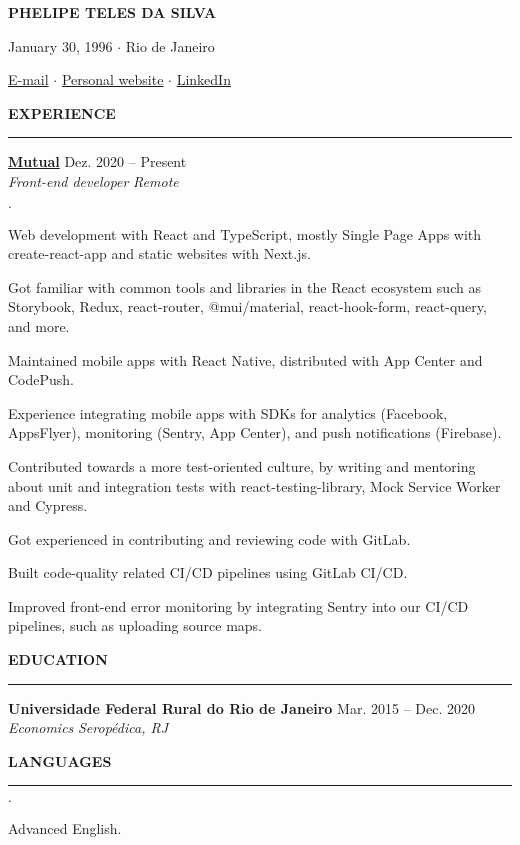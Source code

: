 \documentclass[12pt,letterpaper]{article}
\newenvironment{tightlist}
  {\begin{list}
    {$\cdot$}
    {
      \setlength{\leftmargin}{0em}
      \setlength{\itemsep}{-\smallskipamount}
    }
  }
{\end{list}}
\begin{document}
\pagestyle{empty}

\centerline{\huge\bf PHELIPE TELES DA SILVA}
\medskip

\centerline{January 30, 1996 $\cdot$ Rio de Janeiro}
\smallskip

\centerline{
  \href{mailto:telesphelipe@gmail.com}{E-mail}
  $\cdot$
  \href{https://phelipetls.github.io}{Personal website}
  $\cdot$
  \href{https://linkedin.com/in/phelipeteles}{LinkedIn}
}
\smallskip

\medskip \textbf{EXPERIENCE} \medskip
\hrule

\textbf{\href{https://mutual.club}{Mutual}} \hfill Dez. 2020 -- Present \\
\emph{Front-end developer} \hfill \emph{Remote} {\parfillskip=0pt\par}

\begin{tightlist}
  \item Web development with React and TypeScript, mostly Single Page Apps with
    create-react-app and static websites with Next.js.
  \item Got familiar with common tools and libraries in the React ecosystem such
    as Storybook, Redux, react-router, @mui/material, react-hook-form,
    react-query, and more.
  \item Maintained mobile apps with React Native, distributed with App Center
    and CodePush.
  \item Experience integrating mobile apps with SDKs for analytics (Facebook,
    AppsFlyer), monitoring (Sentry, App Center), and push notifications
    (Firebase).
  \item Contributed towards a more test-oriented culture, by writing and
    mentoring about unit and integration tests with react-testing-library, Mock
    Service Worker and Cypress.
  \item Got experienced in contributing and reviewing code with GitLab.
  \item Built code-quality related CI/CD pipelines using GitLab CI/CD.
  \item Improved front-end error monitoring by integrating Sentry into our CI/CD
    pipelines, such as uploading source maps.
\end{tightlist}

\medskip \textbf{EDUCATION} \medskip
\hrule

\textbf{Universidade Federal Rural do Rio de Janeiro} \hfill {Mar. 2015 -- Dec. 2020} \\
\emph{Economics} \hfill \emph{Seropédica, RJ} {\parfillskip=0pt\par}

\medskip \textbf{LANGUAGES} \medskip
\hrule

\begin{tightlist}
  \item Advanced English.
\end{tightlist}
\end{document}
